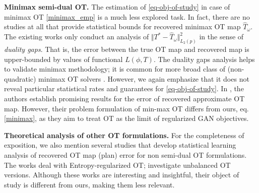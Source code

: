 \textbf{Minimax semi-dual OT.} The estimation of \eqref{eq-obj-of-study} in case of minimax OT \eqref{minimax_emp} is a much less explored task. In fact, there are no studies at all that provide statistical bounds for recovered minimax OT map $\widehat{T}_\omega$. The existing works \citep{makkuva, rout} only conduct an analysis of $\Vert T^* - \widehat{T}_{\omega} \Vert^2_{L_2(p)}$ in the sense of \textit{duality gaps}. That is, the error between the true OT map and recovered map is upper-bounded by values of functional $L(\phi, T)$. The duality gaps analysis helps to validate minimax methodology; it is common for more broad class of (non-quadratic) minimax OT solvers \cite{fan2023neural, gnot, barycenters}. However, we again emphasize that it does not reveal particular statistical rates and guarantees for \eqref{eq-obj-of-study}. In \cite{gonzalez2022gan}, the authors establish promising results for the error of recovered approximate OT map. However, their problem formulation of min-max OT differs from ours, eq. \eqref{minimax}, as they aim to treat OT as the limit of regularized GAN objectives. 

\textbf{Theoretical analysis of other OT formulations.} For the completeness of exposition, we also mention several studies that develop statistical learning analysis of recovered OT map (plan) error for non semi-dual OT formulations. The works \cite{genevay2019sample, rigollet2022sample, gonzalez2023weak, mokrov2024energyguided, goldfeld2024limit, korotin2024light} deal with Entropy-regularized OT; \cite{vacher2022stability, vacher2023semi, gazdieva2024light} investigate unbalanced OT versions.
Although these works are interesting and insightful, their object of study is different from ours, making them less relevant.

